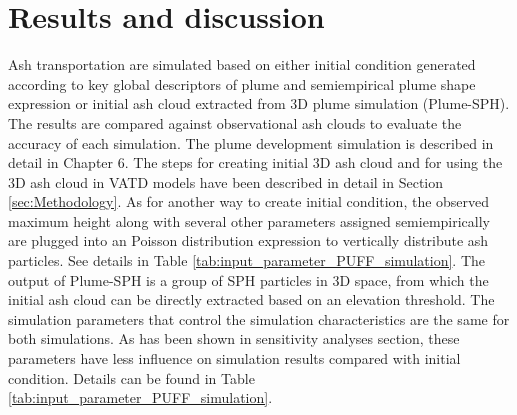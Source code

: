 \section{Results and discussion}

Ash transportation are simulated based on either initial condition generated according to key global descriptors of plume and semiempirical plume shape expression or initial ash cloud extracted from 3D plume simulation (Plume-SPH). The results are compared against observational ash clouds to evaluate the accuracy of each simulation. 
The plume development simulation is described in detail in Chapter 6. 
The steps for creating initial 3D ash cloud and for using the 3D ash cloud in VATD models have been described in detail in Section \ref{sec:Methodology}.
As for another way to create initial condition, the observed maximum height along with several other parameters assigned  semiempirically \citep{bursik2012estimation} are plugged into an Poisson distribution expression to vertically distribute ash particles.
See details in Table \ref{tab:input_parameter_PUFF_simulation}. The output of Plume-SPH is a group of SPH particles in 3D space, from which the initial ash cloud can be directly extracted based on an elevation threshold. The simulation parameters that control the simulation characteristics are the same for both simulations. As has been shown in sensitivity analyses section, these parameters have less influence on simulation results compared with initial condition. Details can be found in Table \ref{tab:input_parameter_PUFF_simulation}.

